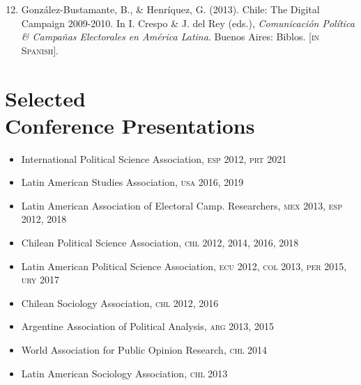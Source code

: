 \documentclass[letterpaper,margin]{res}
\newenvironment{benumerate}[1]{
    \let\oldItem\item
    \def\item{\addtocounter{enumi}{-2}\oldItem}
    \begin{enumerate}
    \setcounter{enumi}{#1}
    \addtocounter{enumi}{1}
}{
    \end{enumerate}
}
\begin{document}
\begin{resume}
\begin{benumerate}{11}

\item{\small Gonz\'alez-Bustamante, B., \& Henr\'iquez, G. (2013). Chile: The Digital Campaign 2009-2010. In I. Crespo \& J. del Rey (eds.), {\itshape Comunicaci\'on Pol\'itica \& Campa\~nas Electorales en Am\'erica Latina}. Buenos Aires: Biblos. {\footnotesize \scshape [in Spanish].}}
\end{benumerate}


\section{\footnotesize Selected \\ Conference Presentations}

\begin{itemize}
\item{\small International Political Science Association, {\scshape esp} 2012, {\scshape prt} 2021}
\item{\small Latin American Studies Association, {\scshape usa} 2016, 2019}
\item{\small Latin American Association of Electoral Camp. Researchers, {\scshape mex} 2013, {\scshape esp} 2012, 2018}
\item{\small Chilean Political Science Association, {\scshape chl} 2012, 2014, 2016, 2018}
\item{\small Latin American Political Science Association, {\scshape ecu} 2012, {\scshape col} 2013, {\scshape per} 2015, {\scshape ury} 2017}
\item{\small Chilean Sociology Association, {\scshape chl} 2012, 2016}
\item{\small Argentine Association of Political Analysis, {\scshape arg} 2013, 2015}
\item{\small World Association for Public Opinion Research, {\scshape chl} 2014}
\item{\small Latin American Sociology Association, {\scshape chl} 2013}
\end{itemize}


\end{resume}
\end{document}

